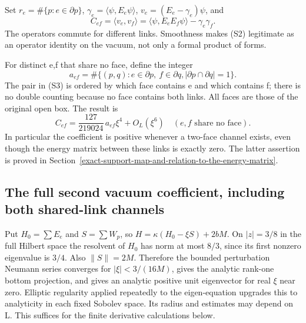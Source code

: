 Set \(r_e=\#\{p:e\in\partial p\}\), \(\gamma_e=\langle\psi,E_e\psi\rangle\), \(v_e=(E_e-\gamma_e)\psi\), and \[
 C_{ef}=\langle v_e,v_f\rangle
   =\langle\psi,E_eE_f\psi\rangle-\gamma_e\gamma_f.
\tag{S2}
\] The operators commute for different links. Smoothness makes (S2) legitimate as an operator identity on the vacuum, not only a formal product of forms.

For distinct e,f that share no face, define the integer \[
 a_{ef}=\#\{(p,q): e\in\partial p,\ f\in\partial q,
                     |\partial p\cap\partial q|=1\}.
\tag{S3}
\] The pair in (S3) is ordered by which face contains e and which contains f; there is no double counting because no face contains both links. All faces are those of the original open box. The result is \[
 \boxed{C_{ef}=\frac{127}{219024}\,a_{ef}\xi^4+O_L(\xi^6)
        \quad(e,f\text{ share no face}).}
\tag{S4}
\] In particular the coefficient is positive whenever a two-face channel exists, even though the energy matrix between these links is exactly zero. The latter assertion is proved in Section~\ref{exact-support-map-and-relation-to-the-energy-matrix}.

\subsection{The full second vacuum coefficient, including both shared-link channels}\label{the-full-second-vacuum-coefficient-including-both-shared-link-channels}

Put \(H_0=\sum E_e\) and \(S=\sum W_p\), so \(H=\kappa(H_0-\xi S)+2bM\). On \(|z|=3/8\) in the full Hilbert space the resolvent of \(H_0\) has norm at most \(8/3\), since its first nonzero eigenvalue is \(3/4\). Also \(\|S\|=2M\). Therefore the bounded perturbation Neumann series converges for \(|\xi|<3/(16M)\), gives the analytic rank-one bottom projection, and gives an analytic positive unit eigenvector for real \(\xi\) near zero. Elliptic regularity applied repeatedly to the eigen-equation upgrades this to analyticity in each fixed Sobolev space. Its radius and estimates may depend on L. This suffices for the finite derivative calculations below.

